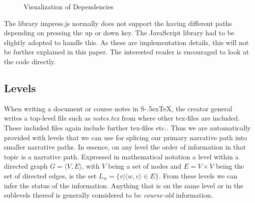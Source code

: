 \documentclass[twoside, 12pt]{article}
\def\stex{\texorpdfstring{\raisebox{-.5ex}S\kern-.5ex\TeX}{sTeX}\xspace}
\begin{document}
\begin{figure}
\vspace{-26pt}
  \begin{center}
\vspace{-20pt}
  \caption{Visualization of Dependencies}
  \label{fig:visualDependency}
\vspace{12pt}
  \end{center}
\end{figure}

\begin{figure}
\vspace{-50pt}
\end{figure}

The library impress.js normally does not support the having different paths depending on pressing the up or down key. The JavaScript library had to be slightly adopted to handle this. As these are implementation details, this will not be further explained in this paper. The interested reader is encouraged to look at the code \cite{npentrel:npentrel15} directly.

\subsection{Levels}
\label{sec:levels}

When writing a document or course notes in \stex, the creator general writes a top-level file such as \textit{notes.tex} from where other tex-files are included. These included files again include further tex-files etc.. Thus we are automatically provided with levels that we can use for splicing our primary narrative path into smaller narrative paths. In essence, on any level the order of information in that topic is a narrative path. Expressed in mathematical notation a level within a directed graph $G = \langle V, E \rangle $, with $V$ being a set of nodes and $E = V \times V$ being the set of directed edges, is the set $L_w = \lbrace v \vert \langle w, v \rangle \in E \rbrace$. From these levels we can infer the status of the information. Anything that is on the same level or in the sublevels thereof is generally considered to be \textit{course-old} information.\\
\end{document}
